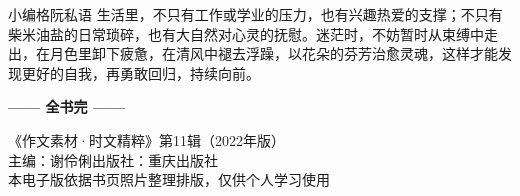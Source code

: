 \begin{quoteBox}{小编格阮私语}
生活里，不只有工作或学业的压力，也有兴趣热爱的支撑；不只有柴米油盐的日常琐碎，也有大自然对心灵的抚慰。迷茫时，不妨暂时从束缚中走出，在月色里卸下疲惫，在清风中褪去浮躁，以花朵的芬芳治愈灵魂，这样才能发现更好的自我，再勇敢回归，持续向前。
\end{quoteBox}

\vspace{2em}
\begin{center}
{\large\color{secblue}\bfseries —— 全书完 ——}
\end{center}

\begin{center}
\small\color{gray}
《作文素材·时文精粹》第11辑（2022年版）\\
主编：谢伶俐\quad 出版社：重庆出版社\\
本电子版依据书页照片整理排版，仅供个人学习使用
\end{center}
